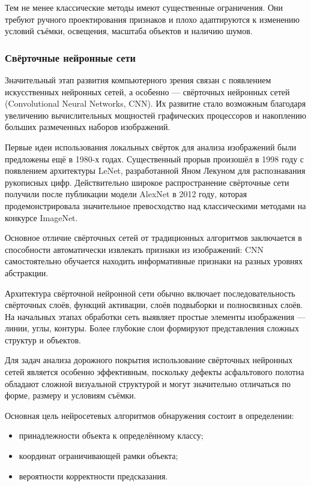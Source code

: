 Тем не менее классические методы имеют существенные ограничения. Они требуют ручного проектирования признаков и плохо адаптируются к изменению условий съёмки, освещения, масштаба объектов и наличию шумов.

\subsubsection{Свёрточные нейронные сети}

Значительный этап развития компьютерного зрения связан с появлением искусственных нейронных сетей, а особенно --- свёрточных нейронных сетей (Convolutional Neural Networks, CNN). Их развитие стало возможным благодаря увеличению вычислительных мощностей графических процессоров и накоплению больших размеченных наборов изображений.

Первые идеи использования локальных свёрток для анализа изображений были предложены ещё в 1980-х годах. Существенный прорыв произошёл в 1998 году с появлением архитектуры LeNet, разработанной Яном Лекуном для распознавания рукописных цифр. Действительно широкое распространение свёрточные сети получили после публикации модели AlexNet в 2012 году, которая продемонстрировала значительное превосходство над классическими методами на конкурсе ImageNet.

Основное отличие свёрточных сетей от традиционных алгоритмов заключается в способности автоматически извлекать признаки из изображений: CNN самостоятельно обучается находить информативные признаки на разных уровнях абстракции.

Архитектура свёрточной нейронной сети обычно включает последовательность свёрточных слоёв, функций активации, слоёв подвыборки и полносвязных слоёв. На начальных этапах обработки сеть выявляет простые элементы изображения --- линии, углы, контуры. Более глубокие слои формируют представления сложных структур и объектов.

Для задач анализа дорожного покрытия использование свёрточных нейронных сетей является особенно эффективным, поскольку дефекты асфальтового полотна обладают сложной визуальной структурой и могут значительно отличаться по форме, размеру и условиям съёмки.

Основная цель нейросетевых алгоритмов обнаружения состоит в определении:

\begin{itemize}
	\item принадлежности объекта к определённому классу;
	\item координат ограничивающей рамки объекта;
	\item вероятности корректности предсказания.
\end{itemize}

